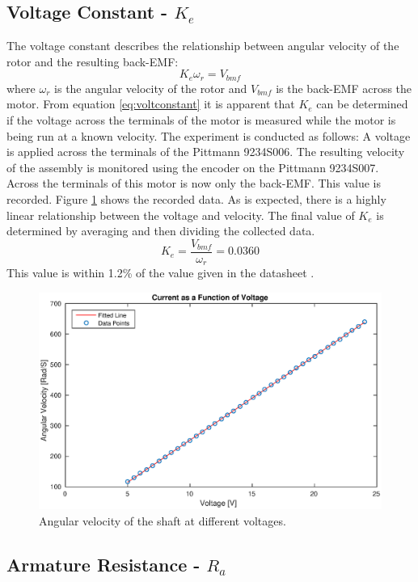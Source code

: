 \subsection{Voltage Constant - $K_e$}
\label{sec:voltconstat}
The voltage constant describes the relationship between angular velocity of the rotor and the resulting back-EMF:
\begin{equation}
	\label{eq:voltconstant}
	K_e\omega_r = V_{bmf}
\end{equation}
where $\omega_r$ is the angular velocity of the rotor and $V_{bmf}$ is the back-EMF across the motor.
From equation \ref{eq:voltconstant} it is apparent that $K_e$ can be determined if the voltage across the terminals of the motor is measured while the motor is being run at a known velocity.
The experiment is conducted as follows:
A voltage is applied across the terminals of the Pittmann 9234S006.
The resulting velocity of the assembly is monitored using the encoder on the Pittmann 9234S007.
Across the terminals of this motor is now only the back-EMF.
This value is recorded.
Figure \ref{fig:velvsvolt} shows the recorded data. 
As is expected, there is a highly linear relationship between the voltage and velocity.
The final value of $K_e$ is determined by averaging and then dividing the collected data.
$$K_e=\frac{V_{bmf}}{\omega_r}=0.0360$$
This value is within 1.2\% of the value given in the datasheet \cite{pittmann}.

\begin{figure}[!h]
	\centering
	\includegraphics[width=.75\linewidth]{graphics/vvsrpm}
	\caption{Angular velocity of the shaft at different voltages.}
	\label{fig:velvsvolt}
\end{figure}

\subsection{Armature Resistance - $R_a$}
\label{sec:armature}
